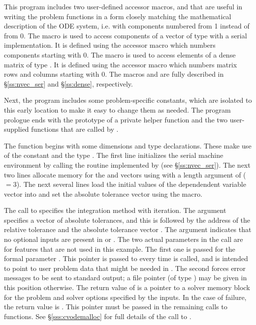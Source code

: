 This program includes two user-defined accessor macros,
 and 
that are useful in writing the problem functions in a form closely
matching the mathematical description of the ODE system, i.e. with
components numbered from 1 instead of from 0. 
The  macro is used to access components of a vector of type 
with a serial implementation. 
It is defined using the {\nvecs} accessor macro  which numbers components 
starting with 0. The  macro is used to access elements of a dense matrix of
type . It is defined using the {\dense} accessor macro 
which numbers matrix rows and columns starting with 0. The macros
 and  are fully described in  \S\ref{ss:nvec_ser} and
\S\ref{ss:dense}, respectively.

Next, the program includes some problem-specific constants, which are
isolated to this early location to make it easy to change them as
needed.
The program prologue ends with the prototype of a private helper
function and the two user-supplied functions that are called by
{\cvodes}.

The  function begins with some dimensions and type
declarations.  These make use of the constant  and the
type .  The first line initializes the serial machine environment
by calling the  routine implemented by {\nvecs}
(see \S\ref{ss:nvec_ser}). The next two lines allocate memory for the
 and  vectors using  with a length
argument of  ($= 3$). The next several lines load the initial
values of the dependendent variable vector into  and set the
absolute tolerance vector  using the  macro.

The call to  specifies the  integration
method with  iteration.  The  argument specifies
a vector of absolute tolerances, and this is followed by the
address of the relative tolerance  and the absolute
tolerance vector .
The  argument indicates that no optional inputs are present
in  or .
The two  actual parameters in the  call 
are for features that are not used in this example. 
The first one is passed for the  formal parameter 
.  This pointer is passed to  every time 
is called, and is intended to point to user problem data that might be
needed in .  The second  forces {\cvodes} error messages to
be sent to standard output; a file pointer (of type ) may be
given in this position otherwise.  
The return value of  is a pointer to a
{\cvodes} solver memory block for the problem and solver options specified
by the inputs.  In the case of failure, the return value is .
This pointer must be passed in the remaining calls to {\cvodes} functions. 
See \S\ref{sss:cvodemalloc} for full details of the call to .


